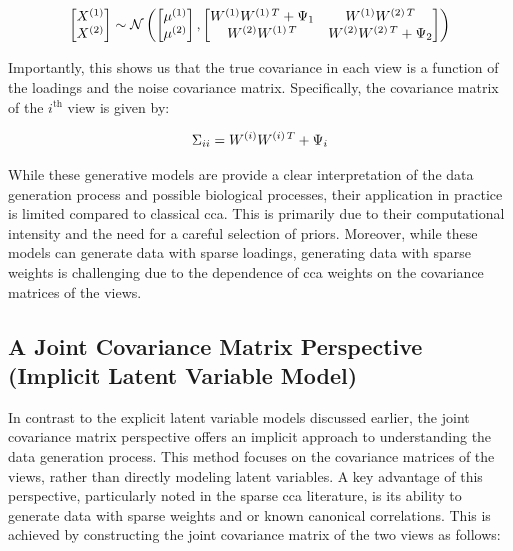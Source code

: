 \begin{align}
    \begin{bmatrix}
        X^{(1)} \\ X^{(2)}
    \end{bmatrix} \sim \mathcal{N} \left( \begin{bmatrix}
                                              \mu^{(1)} \\ \mu^{(2)}
    \end{bmatrix}, \begin{bmatrix}
                       W^{(1)}W^{(1)\,T} + \Psi_1 & W^{(1)}W^{(2)\,T} \\ W^{(2)}W^{(1)\,T} & W^{(2)}W^{(2)\,T} + \Psi_2
    \end{bmatrix} \right)
\end{align}

Importantly, this shows us that the true covariance in each view is a function of the \gls{loadings} and the noise covariance matrix.
Specifically, the covariance matrix of the $i^{\text{th}}$ view is given by:

\begin{align}
    \Sigma_{ii} = W^{(i)}W^{(i)\,T} + \Psi_i
\end{align}

While these generative models are provide a clear interpretation of the data generation process and possible biological processes, their application in practice is limited compared to classical \acrshort{cca}.
This is primarily due to their computational intensity and the need for a careful selection of priors.
Moreover, while these models can generate data with sparse loadings, generating data with sparse weights is challenging due to the dependence of \acrshort{cca} weights on the covariance matrices of the views.

\subsection{A Joint Covariance Matrix Perspective (Implicit Latent Variable Model)}\label{subsubsec:a-joint-covariance-matrix-perspective}

In contrast to the explicit latent variable models discussed earlier, the joint covariance matrix perspective offers an implicit approach to understanding the data generation process.
This method focuses on the covariance matrices of the views, rather than directly modeling latent variables.
A key advantage of this perspective, particularly noted in the sparse \acrshort{cca} literature, is its ability to generate data with sparse weights and or known canonical correlations.
This is achieved by constructing the joint covariance matrix of the two views as follows:

